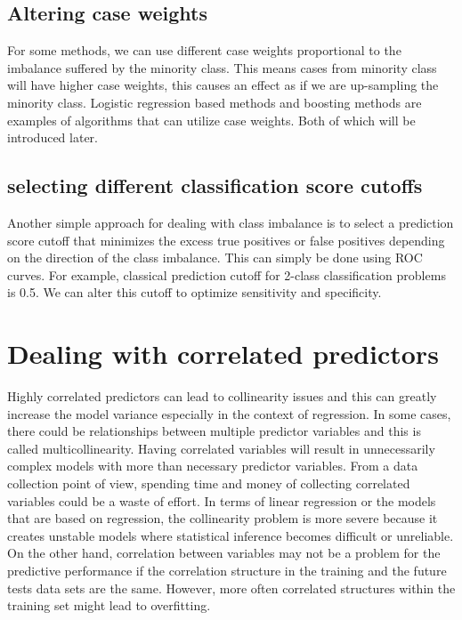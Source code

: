 \documentclass[12pt,]{krantz}
\begin{document}
\hypertarget{altering-case-weights}{%
\subsection{Altering case weights}\label{altering-case-weights}}

For some methods, we can use different case weights proportional to the imbalance suffered by the minority class. This means cases from minority class will have higher case weights, this causes an effect as if we are up-sampling the minority class. Logistic regression based methods and boosting methods are examples of algorithms that can utilize case weights. Both of which will be introduced later.

\hypertarget{selecting-different-classification-score-cutoffs}{%
\subsection{selecting different classification score cutoffs}\label{selecting-different-classification-score-cutoffs}}

Another simple approach for dealing with class imbalance is to select a prediction score cutoff that minimizes the excess true positives or false positives depending on the direction of the class imbalance. This can simply be done using ROC curves. For example, classical prediction cutoff for 2-class classification problems is 0.5. We can alter this cutoff to optimize sensitivity and specificity.

\hypertarget{dealing-with-correlated-predictors}{%
\section{Dealing with correlated predictors}\label{dealing-with-correlated-predictors}}

Highly correlated predictors can lead to collinearity issues and this can greatly increase the model variance especially in the context of regression. In some cases, there could be relationships between multiple predictor variables and this is called multicollinearity. Having correlated variables will result in unnecessarily complex models with more than necessary predictor variables. From a data collection point of view, spending time and money of collecting correlated variables could be a waste of effort. In terms of linear regression or the models that are based on regression, the collinearity problem is more severe because it creates unstable models where statistical inference becomes difficult or unreliable. On the other hand, correlation between variables may not be a problem for the predictive performance if the correlation structure in the training and the future tests data sets are the same. However, more often correlated structures within the training set might lead to overfitting.
\end{document}
